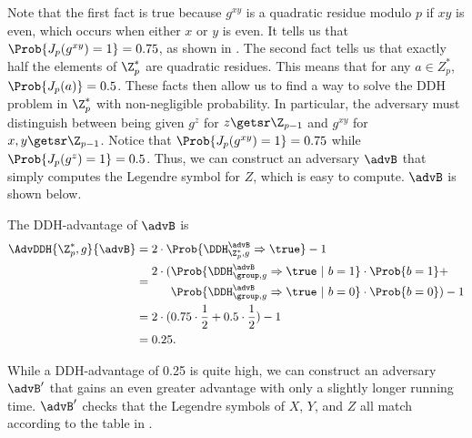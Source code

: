 Note that the first fact is true because $g^{xy}$ is a quadratic residue modulo $p$ if $xy$ is even, which occurs when either $x$ or $y$ is even. It tells us that $\Prob{J_p(g^{xy})=1}=0.75$, as shown in . The second fact tells us that exactly half the elements of $\Z_p^*$ are quadratic residues. This means that for any $a \in Z_p^*$, $\Prob{J_p(a)}=0.5$. These facts then allow us to find a way to solve the DDH problem in $\Z_p^*$ with non-negligible probability. In particular, the adversary must distinguish between being given $g^z$ for $z \getsr \Z_{p-1}$ and $g^{xy}$ for $x,y \getsr \Z_{p-1}$. Notice that $\Prob{J_p(g^{xy})=1}=0.75$ while $\Prob{J_p(g^{z})=1}=0.5$. Thus, we can construct an adversary $\advB$ that simply computes the Legendre symbol for $Z$, which is easy to compute. $\advB$ is shown below.
\begin{center}
\end{center}
The DDH-advantage of $\advB$ is
\begin{align*}
	\AdvDDH{\Z_p^*,g}{\advB} &= 2 \cdot \Prob{\DDH_{\Z_p^*, g}^\advB\Rightarrow\true} - 1 \\
	&=
	\begin{aligned}
		2 \cdot (&\Prob{\DDH_{\group, g}^\advB\Rightarrow\true \ | \ b=1}\cdot\Prob{b=1} + \\
		&\Prob{\DDH_{\group, g}^\advB\Rightarrow\true \ | \ b=0}\cdot\Prob{b=0}) - 1
	\end{aligned} \\
	&= 2 \cdot (0.75 \cdot \frac{1}{2} + 0.5 \cdot \frac{1}{2}) - 1 \\
	&= 0.25.
\end{align*}

While a DDH-advantage of 0.25 is quite high, we can construct an adversary $\advB'$ that gains an even greater advantage with only a slightly longer running time. $\advB'$ checks that the Legendre symbols of $X$, $Y$, and $Z$ all match according to the table in .

\begin{center}
\end{center}

